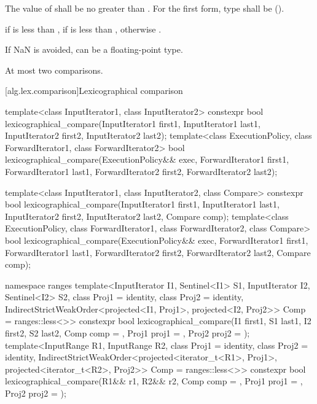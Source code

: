 \begin{itemdescr}
\pnum
\requires
The value of  shall be no greater than .
For the first form, type 
shall be  ().

\pnum
\returns
{} if  is less than ,
 if  is less than ,
otherwise .

\pnum
\begin{note}
If NaN is avoided,  can be a floating-point type.
\end{note}

\pnum
\complexity
At most two comparisons.
\end{itemdescr}

[alg.lex.comparison]{Lexicographical comparison}

%
\begin{itemdecl}
template<class InputIterator1, class InputIterator2>
  constexpr bool
    lexicographical_compare(InputIterator1 first1, InputIterator1 last1,
                            InputIterator2 first2, InputIterator2 last2);
template<class ExecutionPolicy, class ForwardIterator1, class ForwardIterator2>
  bool
    lexicographical_compare(ExecutionPolicy&& exec,
                            ForwardIterator1 first1, ForwardIterator1 last1,
                            ForwardIterator2 first2, ForwardIterator2 last2);

template<class InputIterator1, class InputIterator2, class Compare>
  constexpr bool
    lexicographical_compare(InputIterator1 first1, InputIterator1 last1,
                            InputIterator2 first2, InputIterator2 last2,
                            Compare comp);
template<class ExecutionPolicy, class ForwardIterator1, class ForwardIterator2,
         class Compare>
  bool
    lexicographical_compare(ExecutionPolicy&& exec,
                            ForwardIterator1 first1, ForwardIterator1 last1,
                            ForwardIterator2 first2, ForwardIterator2 last2,
                            Compare comp);

namespace ranges {
  template<InputIterator I1, Sentinel<I1> S1, InputIterator I2, Sentinel<I2> S2,
           class Proj1 = identity, class Proj2 = identity,
           IndirectStrictWeakOrder<projected<I1, Proj1>,
                                   projected<I2, Proj2>> Comp = ranges::less<>>
    constexpr bool
      lexicographical_compare(I1 first1, S1 last1, I2 first2, S2 last2,
                              Comp comp = {}, Proj1 proj1 = {}, Proj2 proj2 = {});
  template<InputRange R1, InputRange R2, class Proj1 = identity,
           class Proj2 = identity,
           IndirectStrictWeakOrder<projected<iterator_t<R1>, Proj1>,
                                   projected<iterator_t<R2>, Proj2>> Comp = ranges::less<>>
    constexpr bool
      lexicographical_compare(R1&& r1, R2&& r2, Comp comp = {},
                              Proj1 proj1 = {}, Proj2 proj2 = {});
}
\end{itemdecl}

